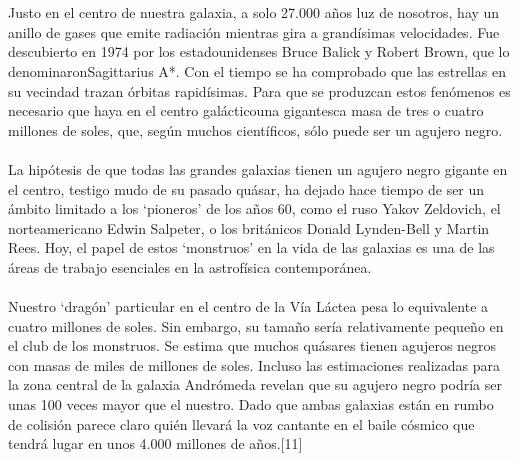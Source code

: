 \documentclass[12pt]{article}
\begin{document}
\\\\
Justo en el centro de nuestra galaxia, a solo 27.000 años luz de nosotros, hay un anillo de gases que emite radiación mientras gira a grandísimas velocidades. Fue descubierto en 1974 por los estadounidenses Bruce Balick y Robert Brown, que lo denominaronSagittarius A*. Con el tiempo se ha comprobado que las estrellas en su vecindad trazan órbitas rapidísimas. Para que se produzcan estos fenómenos es necesario que haya en el centro galácticouna gigantesca masa de tres o cuatro millones de soles, que, según muchos científicos, sólo puede ser un agujero negro.\\\\
La hipótesis de que todas las grandes galaxias tienen un agujero negro gigante en el centro, testigo mudo de su pasado quásar, ha dejado hace tiempo de ser un ámbito limitado a los ‘pioneros’ de los años 60, como el ruso Yakov Zeldovich, el norteamericano Edwin Salpeter, o los británicos Donald Lynden-Bell y Martin Rees. Hoy, el papel de estos ‘monstruos’ en la vida de las galaxias es una de las áreas de trabajo esenciales en la astrofísica contemporánea.\\\\
Nuestro ‘dragón’ particular en el centro de la Vía Láctea pesa lo equivalente a cuatro millones de soles. Sin embargo, su tamaño sería relativamente pequeño en el club de los monstruos. Se estima que muchos quásares tienen agujeros negros con masas de miles de millones de soles. Incluso las estimaciones realizadas para la zona central de la galaxia Andrómeda revelan que su agujero negro podría ser unas 100 veces mayor que el nuestro. Dado que ambas galaxias están en rumbo de colisión parece claro quién llevará la voz cantante en el baile cósmico que tendrá lugar en unos 4.000 millones de años.[11]
\\\\%
\end{document}
